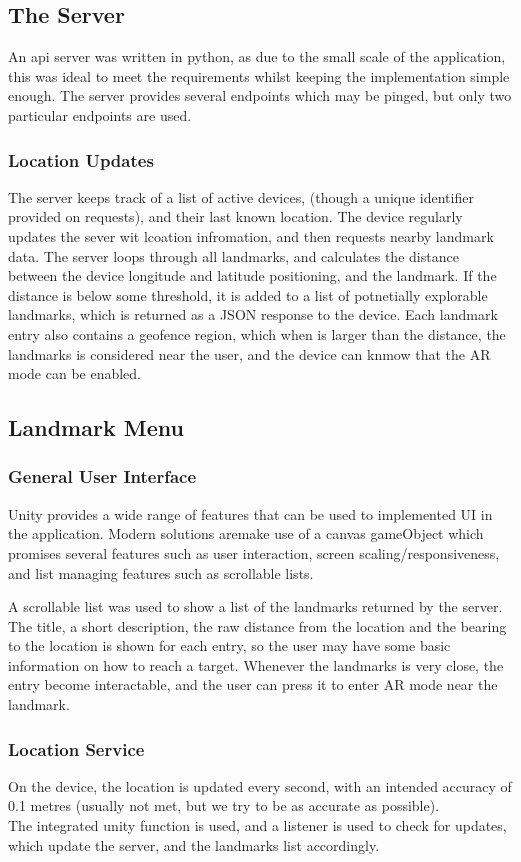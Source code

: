 
\subsection{The Server}
An api server was written in python, as due to the small scale of the application, this was ideal to meet the requirements whilst keeping the 
implementation simple enough. The server provides several endpoints which may be pinged, but only two particular endpoints are used. 
\subsubsection{Location Updates}
The server keeps track of a list of active devices, (though a unique identifier provided on requests), and their last known location.
The device regularly updates the sever wit lcoation infromation, and then requests nearby landmark data. 
The server loops through all landmarks, and calculates the distance between the device longitude and latitude positioning, and the landmark.
If the distance is below some threshold, it is added to a list of potnetially explorable landmarks, which is returned as a JSON response 
to the device. Each landmark entry also contains a geofence region, which when is larger than the distance, the landmarks is considered near 
the user, and the device can knmow that the AR mode can be enabled.


\subsection{Landmark Menu}
\subsubsection{General User Interface}
Unity provides a wide range of features that can be used to implemented UI in the application. 
Modern solutions aremake use of a canvas gameObject which promises several features such as user interaction, screen scaling/responsiveness, and 
list managing features such as scrollable lists.

A scrollable list was used to show a list of the landmarks returned by the server. The title,
a short description, the raw distance from the location and the bearing to the location is shown for each entry,
 so the user may have some basic information on how to reach a target.
  Whenever the landmarks is very close, the entry become interactable, and the user can press it 
to enter AR mode near the landmark. 

\subsubsection{Location Service}
On the device, the location is updated every second, with an intended accuracy of 0.1 metres 
(usually not met, but we try to be as accurate as possible).\\
The integrated unity function is used, and a listener is used to check for updates, which update the server,
and the landmarks list accordingly.

